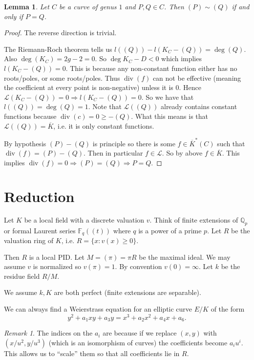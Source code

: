 \documentclass[11pt]{article}
\newcommand{\BB}[1]{\mathbb{#1}} %
\newcommand{\curly}[1]{\mathscr{#1}} %
\newcommand{\QQ}{\BB{Q}}
\newcommand{\FF}{\BB{F}}
\newcommand{\st}{\colon}
\renewcommand{\div}{\operatorname{div}} %
\theoremstyle{plain}%
\newtheorem{lem}[thm]{Lemma}
\theoremstyle{definition}
\theoremstyle{remark}
\newtheorem{rem}[thm]{Remark}
\begin{document}
\begin{lem} %
	Let $C$ be a curve of genus $1$ and $P,Q\in C$. Then $(P)\sim (Q)$ if and only if $P=Q$.
\end{lem}
\begin{proof} %
	The reverse direction is trivial.

	The Riemann-Roch theorem tells us $l((Q)) - l(K_C-(Q)) = \deg (Q)$. Also $\deg(K_C) = 2g-2 = 0$. So $\deg K_C-D<0$ which implies $l(K_C-(Q))=0$. This is because any non-constant function either has no roots/poles, or some roots/poles. Thus $\div(f)$ can not be effective (meaning the coefficient at every point is non-negative) unless it is $0$. Hence $\curly{L}(K_C-(Q))=0 \Rightarrow l(K_C-(Q))=0$. So we have that $l((Q))=\deg (Q) = 1$. Note that $\curly{L}((Q))$ already contains constant functions because $\div(c) = 0\geq -(Q)$. What this means is that $\curly{L}((Q))=\overline{K}$, i.e. it is only constant functions.

	By hypothesis $(P)-(Q)$ is principle so there is some $f\in\overline{K}^*(C)$ such that $\div(f) = (P) - (Q)$. Then in particular $f\in\curly{L}$. So by above $f\in\overline{K}$. This implies $\div(f) = 0 \Rightarrow (P)=(Q) \Rightarrow P=Q$.
\end{proof}


\section{Reduction}

Let $K$ be a local field with a discrete valuation $v$. Think of finite extensions of $\QQ_p$ or formal Laurent series $\FF_{q}((t))$ where $q$ is a power of a prime $p$. Let $R$ be the valuation ring of $K$, i.e. $R = \{x \st v(x)\geq 0\}$.

Then $R$ is a local PID. Let $M=(\pi)=\pi R$ be the maximal ideal. We may assume $v$ is normalized so $v(\pi)=1$. By convention $v(0)=\infty$. Let $k$ be the residue field $R/M$.

We assume $k,K$ are both perfect (finite extensions are separable).

We can always find a Weierstrass equation for an elliptic curve $E/K$ of the form
$$
y^2 + a_1xy + a_3y
=
x^3 + a_2x^2 + a_4x + a_6.
$$

\begin{rem}
	The indices on the $a_i$ are because if we replace $(x,y)$ with $(x/u^2,y/u^3)$ (which is an isomorphism of curves) the coefficients become $a_iu^i$. This allows us to ``scale'' them so that all coefficients lie in $R$.
\end{rem}
\end{document}
